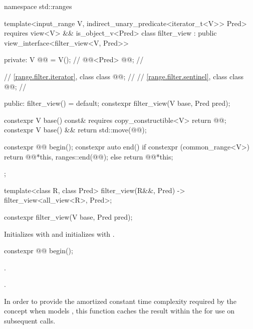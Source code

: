%
%
%
\begin{codeblock}
namespace std::ranges {
  template<input_range V, indirect_unary_predicate<iterator_t<V>> Pred>
    requires view<V> && is_object_v<Pred>
  class filter_view : public view_interface<filter_view<V, Pred>> {
  private:
    V @@ = V();                      // \expos
    @@<Pred> @@;  // \expos

    // \ref{range.filter.iterator}, class 
    class @@;                     // \expos
    // \ref{range.filter.sentinel}, class 
    class @@;                     // \expos

  public:
    filter_view() = default;
    constexpr filter_view(V base, Pred pred);

    constexpr V base() const& requires copy_constructible<V> { return @@; }
    constexpr V base() && { return std::move(@@); }

    constexpr @@ begin();
    constexpr auto end() {
      if constexpr (common_range<V>)
        return @@{*this, ranges::end(@@)};
      else
        return @@{*this};
    }
  };

  template<class R, class Pred>
    filter_view(R&&, Pred) -> filter_view<all_view<R>, Pred>;
}
\end{codeblock}

%
\begin{itemdecl}
constexpr filter_view(V base, Pred pred);
\end{itemdecl}

\begin{itemdescr}
\pnum
\effects
Initializes  with  and initializes
 with .
\end{itemdescr}

%
\begin{itemdecl}
constexpr @@ begin();
\end{itemdecl}

\begin{itemdescr}
\pnum
\expects
{}.

\pnum
\returns
{}.

\pnum
\remarks
In order to provide the amortized constant time complexity required by
the  concept
when  models ,
this function caches the result within the
 for use on subsequent calls.
\end{itemdescr}

